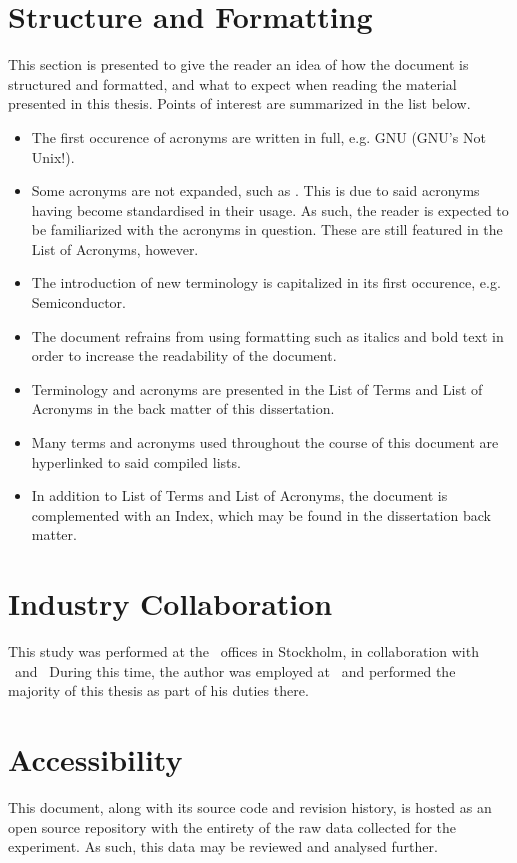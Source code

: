 \section*{Structure and Formatting}
\label{sec:preface_structureandformatting}
This section is presented to give the reader an idea of how the document is structured and formatted, and what to expect when reading the material presented in this thesis.
Points of interest are summarized in the list below.
\begin{itemize}[noitemsep]
	\item The first occurence of acronyms are written in full, e.g. GNU (GNU's Not Unix!).
	\item Some acronyms are not expanded, such as \dvttermcpu . This is due to said acronyms having become standardised in their usage. As such, the reader is expected to be familiarized with the acronyms in question. These are still featured in the List of Acronyms, however. 
	\item The introduction of new terminology is capitalized in its first occurence, e.g. Semiconductor.
	\item The document refrains from using formatting such as italics and bold text in order to increase the readability of the document.
	\item Terminology and acronyms are presented in the List of Terms and List of Acronyms in the back matter of this dissertation.
	\item Many terms and acronyms used throughout the course of this document are hyperlinked to said compiled lists.
	\item In addition to List of Terms and List of Acronyms, the document is complemented with an Index, which may be found in the dissertation back matter.
\end{itemize}

\section*{Industry Collaboration}
\label{sec:preface_industrycollaboration}
This study was performed at the \dvttermintel\ offices in Stockholm, in collaboration with \dvttermintel\ and \dvttermwindriver\
During this time, the author was employed at \dvttermintel\ and performed the majority of this thesis as part of his duties there.

\section*{Accessibility}
\label{sec:preface_accessibility}
This document, along with its source code and revision history, is hosted as an open source repository with the entirety of the raw data collected for the experiment.
As such, this data may be reviewed and analysed further.

